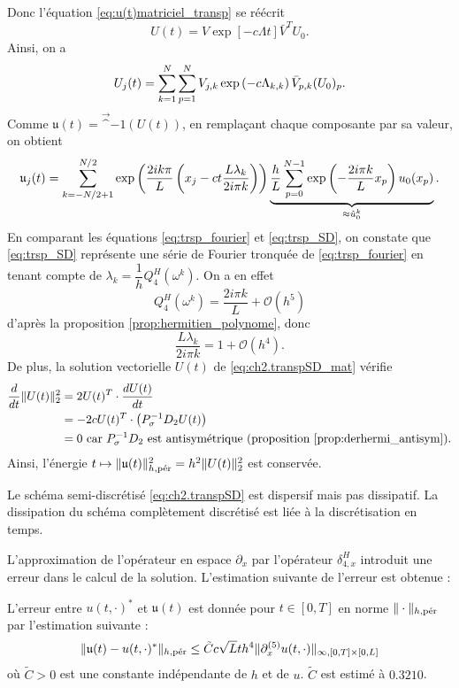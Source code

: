 Donc l'équation \eqref{eq:u(t)matriciel_transp} se réécrit
\begin{equation}
U(t) = V \exp \left[-c \Lambda t \right] \bar{V}^T U_0.
\end{equation}
Ainsi, on a
\begin{equation}
U_j(t) = \gsum_{k=1}^{N} \gsum_{p=1}^N V_{j,k} \exp \left( - c \Lambda_{k,k}  \right)  \bar{V}_{p,k}(U_0)_p.
\end{equation}
Comme $\mathfrak{u}(t) = \vec^{-1}(U(t))$, en remplaçant chaque composante par sa valeur, on obtient
\begin{equation}
\mathfrak{u}_j(t) = \gsum_{k=-N/2+1}^{N/2} \exp \left( \dfrac{2 i k \pi}{L} \left( x_j - ct \dfrac{L \lambda_k}{2 i \pi k} \right) \right) \underbrace{\dfrac{h}{L} \gsum_{p=0}^{N-1} \exp \left( - \dfrac{2 i \pi k}{L} x_p \right) u_0(x_p)}_{ \approx \hat{u}^k_0}.
\label{eq:trsp_SD}
\end{equation}
En comparant les équations \eqref{eq:trsp_fourier} et \eqref{eq:trsp_SD}, on constate que \eqref{eq:trsp_SD} représente une série de Fourier tronquée de \eqref{eq:trsp_fourier} en tenant compte de $\lambda_k = \dfrac{1}{h}Q_4^H(\omega^k)$. On a en effet
\begin{equation}
Q_4^H(\omega^k) = \dfrac{2 i \pi k}{L} + \mathcal{O} \left( h^5 \right)
\end{equation}
d'après la proposition \ref{prop:hermitien_polynome}, donc
\begin{equation}
\dfrac{L \lambda_k}{2 i \pi k} = 1 + \mathcal{O}(h^4).
\end{equation}
De plus, la solution vectorielle $U(t)$ de \eqref{eq:ch2.transpSD_mat} vérifie
\begin{align*}
\dfrac{d}{dt} \| U(t) \|_2^2 & = 2 U(t)^T \cdot \dfrac{d U(t)}{dt} \\
	& = - 2 c U(t)^T \cdot \left( P_{\sigma}^{-1}D_2 U(t) \right) \\
	& = 0 \text{ car } P_{\sigma}^{-1}D_2 \text{ est antisymétrique (proposition \ref{prop:derhermi_antisym})}.
\end{align*}
Ainsi, l'énergie $t \mapsto \| \mathfrak{u}(t) \|_{h,\per}^2 = h^2 \| U(t) \|_2^2$ est conservée.

Le schéma semi-discrétisé \eqref{eq:ch2.transpSD} est dispersif mais pas dissipatif. La dissipation du schéma complètement discrétisé est liée à la discrétisation en temps.

L'approximation de l'opérateur en espace $\partial_x$ par l'opérateur $\delta_{4,x}^H$ introduit une erreur dans le calcul de la solution. L'estimation suivante de l'erreur est obtenue :
\begin{proposition}
L'erreur entre $u(t,\cdot)^*$ et $\mathfrak{u}(t)$ est donnée pour $t \in [0,T]$ en norme $\| \cdot \|_{h,\per}$ par l'estimation suivante :
\begin{equation}
\| \mathfrak{u}(t) - u(t,\cdot)^* \|_{h,\per} \leq \tilde{C} c \sqrt{L} t h^4 \| \partial_x^{(5)} u(t,\cdot) \|_{\infty,[0,T] \times [0,L]}
\end{equation}
où $\tilde{C}>0$ est une constante indépendante de $h$ et de $u$. $\tilde{C}$ est estimé à $0.3210$.
\label{prop:consistance_h_trsp}
\end{proposition}


